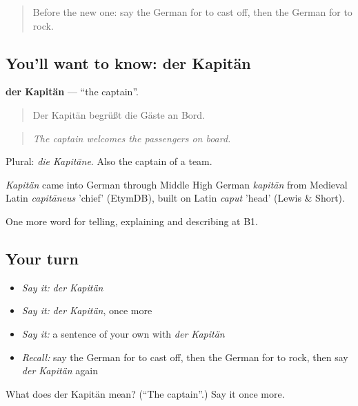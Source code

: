 \label{lesson:GE-C422-kapitaen}



\begin{quote}
Before the new one: say the German for to cast off, then the German for to rock.
\end{quote}

\subsection*{You'll want to know: der Kapitän}
\textbf{der Kapitän} — \textquotedblleft{}the captain\textquotedblright{}.

\begin{quote}
Der Kapitän begrüßt die Gäste an Bord.
\end{quote}

\begin{quote}
\emph{The captain welcomes the passengers on board.}
\end{quote}

Plural: \emph{die Kapitäne}. Also the captain of a team.

\begin{cousinweb}
\emph{Kapitän} came into German through Middle High German \emph{kapitān} from Medieval Latin \emph{capitāneus} 'chief' (EtymDB), built on Latin \emph{caput} 'head' (Lewis \& Short).
\end{cousinweb}

\begin{grammarlens}[title={What you've built}]
One more word for telling, explaining and describing at B1.
\end{grammarlens}

\subsection*{Your turn}
\begin{itemize}
\raggedright
  \item \emph{Say it:} \emph{der Kapitän}
  \item \emph{Say it:} \emph{der Kapitän}, once more
  \item \emph{Say it:} a sentence of your own with \emph{der Kapitän}
  \item \emph{Recall:} say the German for to cast off, then the German for to rock, then say \emph{der Kapitän} again
\end{itemize}

\begin{tcolorbox}[breakable,colback=teal!4,colframe=teal!35!black,title={Before you move on}]
What does der Kapitän mean? (\textquotedblleft{}The captain\textquotedblright{}.) Say it once more.
\end{tcolorbox}
